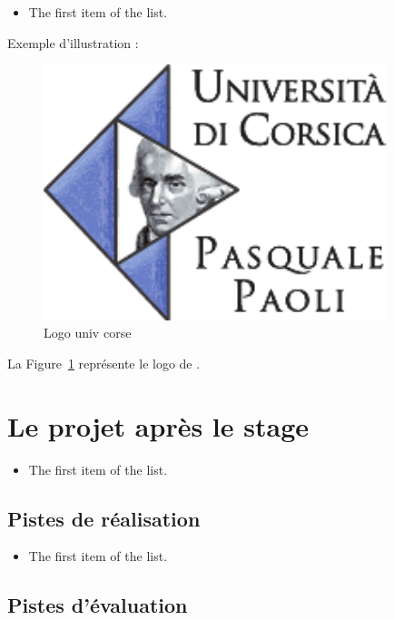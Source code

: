 \documentclass{rapport_stage}
\begin{document}
\begin{itemize}[label=$\bullet$]
  \item The first item of the list.
\end{itemize}

Exemple d'illustration :

\begin{figure}[ht]
  \centering
  \includegraphics[width=10cm]{figures/univ-logo.pdf}
  \caption{Logo univ corse}
  \label{fig:logo-corse}
\end{figure}

La Figure~\ref{fig:logo-corse} représente le logo de \reportSchool{}.



\cleardoublepage


\part{Le projet après le stage}

\begin{itemize}[label=$\bullet$]
  \item The first item of the list.
\end{itemize}

\chapter{Pistes de réalisation}

\begin{itemize}[label=$\bullet$]
  \item The first item of the list.
\end{itemize}

\chapter{Pistes d'évaluation}
\end{document}
